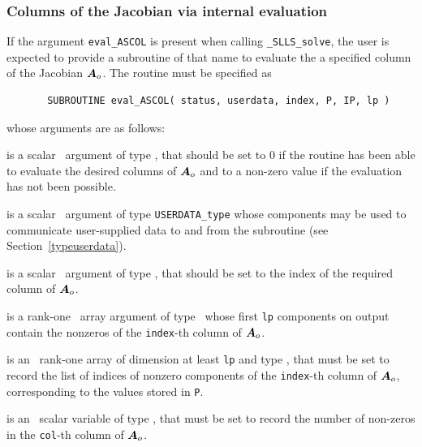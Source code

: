 \documentclass{galahad}
\newcommand{\packagename}{SLLS}
\newcommand{\fullpackagename}{\libraryname\_\packagename}
\newcommand{\solver}{{\tt \fullpackagename\_solve}}
\begin{document}

\subsubsection{Columns of the Jacobian via internal evaluation\label{jvps}}

If the argument {\tt eval\_ASCOL} is present when calling \solver, the
user is expected to provide a subroutine of that name to evaluate the
a specified column of the Jacobian ${\bm{A}}_o$.
The routine must be specified as

\def\baselinestretch{0.8}
{\tt \begin{verbatim}
       SUBROUTINE eval_ASCOL( status, userdata, index, P, IP, lp )
\end{verbatim} }
\def\baselinestretch{1.0}
\noindent whose arguments are as follows:

\begin{description}
 is a scalar \intentout\ argument of type \integer,
that should be set to 0 if the routine has been able to evaluate the desired 
columns of ${\bm{A}}_o$ and to a non-zero value if the evaluation has not 
been possible.

 is a scalar \intentinout\ argument of type
{\tt USERDATA\_type} whose components may be used
to communicate user-supplied data to and from the
subroutine (see Section~\ref{typeuserdata}).

 is a scalar \intentout\ argument of type \integer,
that should be set to the index of the required column of ${\bm{A}}_o$.

 is a rank-one \intentout\ array argument of type \realdp\
whose first {\tt lp} components on output contain the 
nonzeros of the {\tt index}-th column of ${\bm{A}}_o$.

 is an \intentinout\ rank-one array of dimension at least
{\tt lp} and type \integer, that must be set to record the list
of indices of nonzero components of the {\tt index}-th column of ${\bm{A}}_o$,
corresponding to the values stored in {\tt P}.

 is an \intentinout\ scalar variable of type \integer,
that must be set to record the number of non-zeros in the {\tt col}-th column
of ${\bm{A}}_o$.

\end{description}

\end{document}
